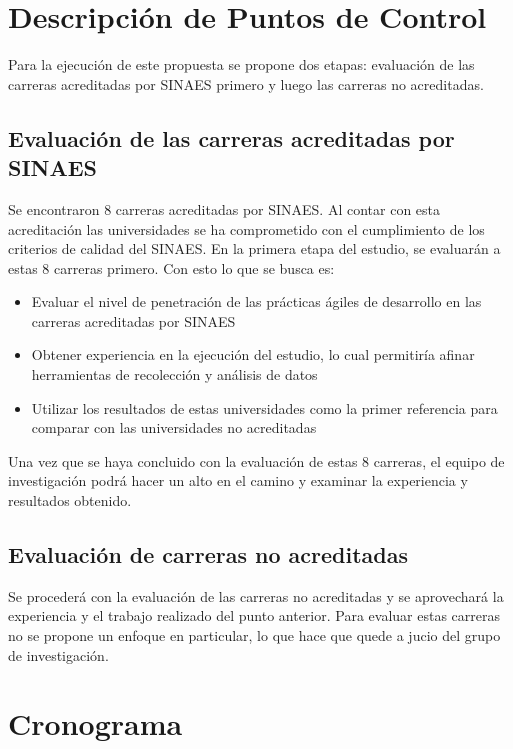 \section{Descripción de Puntos de Control}

Para la ejecución de este propuesta se propone dos etapas: evaluación de las carreras acreditadas por SINAES primero y luego las carreras no acreditadas.

\subsection{Evaluación de las carreras acreditadas por SINAES}
Se encontraron 8 carreras acreditadas por SINAES. Al contar con esta acreditación las universidades se ha comprometido con el cumplimiento de los criterios de calidad del SINAES. En la primera etapa del estudio, se evaluarán a estas 8 carreras primero. Con esto lo que se busca es:
\begin{itemize}
    \item Evaluar el nivel de penetración de las prácticas ágiles de desarrollo en las carreras acreditadas por SINAES
    \item Obtener experiencia en la ejecución del estudio, lo cual permitiría afinar herramientas de recolección y análisis de datos
    \item Utilizar los resultados de estas universidades como la primer referencia para comparar con las universidades no acreditadas
\end{itemize}

Una vez que se haya concluido con la evaluación de estas 8 carreras, el equipo de investigación podrá hacer un alto en el camino y examinar la experiencia y resultados obtenido.

\subsection{Evaluación de carreras no acreditadas}
Se procederá con la evaluación de las carreras no acreditadas y se aprovechará la experiencia y el trabajo realizado del punto anterior. Para evaluar estas carreras no se propone un enfoque en particular, lo que hace que quede a jucio del grupo de investigación.


\section{Cronograma}

